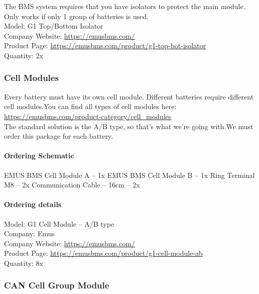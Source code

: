 The BMS system requires that you have isolators to protect the main module. Only works if only 1 group of batteries is used.
 \\
Model: G1 Top/Bottom Isolator\\
Company Website: \href{https://emusbms.com/}{https://emusbms.com/} \\
Product Page: \href{https://emusbms.com/product/g1-top-bot-isolator}{https://emusbms.com/product/g1-top-bot-isolator} \\
Quantity: 2x \\

\subsubsection{Cell Modules}

Every battery must have its own cell module. Different batteries require different cell modules.You can find all types of cell modules here:
 \\
\href{https://emusbms.com/product-category/cell_modules}{https://emusbms.com/product-category/cell\_modules}
 \\
The standard solution is the A/B type, so that’s what we’re going with.We must order this package for each battery.

\paragraph{Ordering Schematic}
EMUS BMS Cell Module A – 1x
EMUS BMS Cell Module B – 1x
Ring Terminal M8 – 2x
Communication Cable – 16cm – 2x
\par
\paragraph{Ordering details}

Model: G1 Cell Module – A/B type\\
Company: Emus\\
Company Website: \href{https://emusbms.com}{https://emusbms.com/} \\
Product Page: \href{https://emusbms.com/product/g1-cell-module-ab}{https://emusbms.com/product/g1-cell-module-ab} \\
Quantity: 8x \\

\subsubsection{CAN Cell Group Module}

